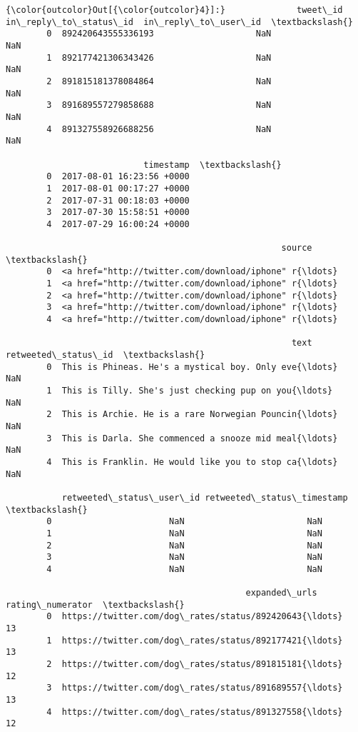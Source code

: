 \documentclass[11pt]{article}
\begin{document}
\begin{Verbatim}[commandchars=\\\{\}]
{\color{outcolor}Out[{\color{outcolor}4}]:}              tweet\_id  in\_reply\_to\_status\_id  in\_reply\_to\_user\_id  \textbackslash{}
        0  892420643555336193                    NaN                  NaN   
        1  892177421306343426                    NaN                  NaN   
        2  891815181378084864                    NaN                  NaN   
        3  891689557279858688                    NaN                  NaN   
        4  891327558926688256                    NaN                  NaN   
        
                           timestamp  \textbackslash{}
        0  2017-08-01 16:23:56 +0000   
        1  2017-08-01 00:17:27 +0000   
        2  2017-07-31 00:18:03 +0000   
        3  2017-07-30 15:58:51 +0000   
        4  2017-07-29 16:00:24 +0000   
        
                                                      source  \textbackslash{}
        0  <a href="http://twitter.com/download/iphone" r{\ldots}   
        1  <a href="http://twitter.com/download/iphone" r{\ldots}   
        2  <a href="http://twitter.com/download/iphone" r{\ldots}   
        3  <a href="http://twitter.com/download/iphone" r{\ldots}   
        4  <a href="http://twitter.com/download/iphone" r{\ldots}   
        
                                                        text  retweeted\_status\_id  \textbackslash{}
        0  This is Phineas. He's a mystical boy. Only eve{\ldots}                  NaN   
        1  This is Tilly. She's just checking pup on you{\ldots}                  NaN   
        2  This is Archie. He is a rare Norwegian Pouncin{\ldots}                  NaN   
        3  This is Darla. She commenced a snooze mid meal{\ldots}                  NaN   
        4  This is Franklin. He would like you to stop ca{\ldots}                  NaN   
        
           retweeted\_status\_user\_id retweeted\_status\_timestamp  \textbackslash{}
        0                       NaN                        NaN   
        1                       NaN                        NaN   
        2                       NaN                        NaN   
        3                       NaN                        NaN   
        4                       NaN                        NaN   
        
                                               expanded\_urls  rating\_numerator  \textbackslash{}
        0  https://twitter.com/dog\_rates/status/892420643{\ldots}                13   
        1  https://twitter.com/dog\_rates/status/892177421{\ldots}                13   
        2  https://twitter.com/dog\_rates/status/891815181{\ldots}                12   
        3  https://twitter.com/dog\_rates/status/891689557{\ldots}                13   
        4  https://twitter.com/dog\_rates/status/891327558{\ldots}                12   
        

\end{Verbatim}
\end{document}
